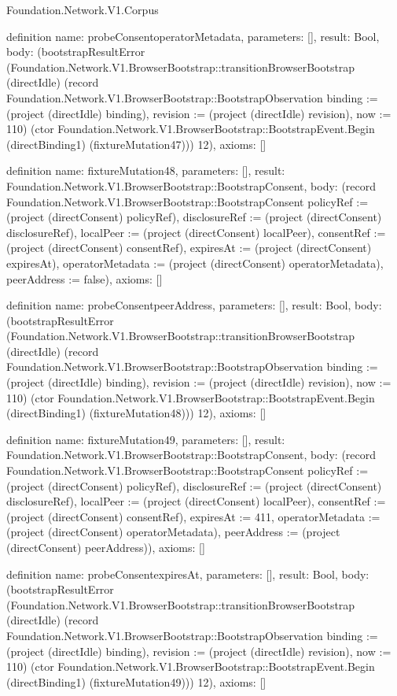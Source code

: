 \begin{lexlean}{Foundation.Network.V1.Corpus}
\begin{semanticmodule}
definition{
  name: probeConsentoperatorMetadata,
  parameters: [],
  result: Bool,
  body: (bootstrapResultError (Foundation.Network.V1.BrowserBootstrap::transitionBrowserBootstrap (directIdle) (record Foundation.Network.V1.BrowserBootstrap::BootstrapObservation {binding := (project (directIdle) binding), revision := (project (directIdle) revision), now := 110}) (ctor Foundation.Network.V1.BrowserBootstrap::BootstrapEvent.Begin (directBinding1) (fixtureMutation47))) 12),
  axioms: []
}

definition{
  name: fixtureMutation48,
  parameters: [],
  result: Foundation.Network.V1.BrowserBootstrap::BootstrapConsent,
  body: (record Foundation.Network.V1.BrowserBootstrap::BootstrapConsent {policyRef := (project (directConsent) policyRef), disclosureRef := (project (directConsent) disclosureRef), localPeer := (project (directConsent) localPeer), consentRef := (project (directConsent) consentRef), expiresAt := (project (directConsent) expiresAt), operatorMetadata := (project (directConsent) operatorMetadata), peerAddress := false}),
  axioms: []
}

definition{
  name: probeConsentpeerAddress,
  parameters: [],
  result: Bool,
  body: (bootstrapResultError (Foundation.Network.V1.BrowserBootstrap::transitionBrowserBootstrap (directIdle) (record Foundation.Network.V1.BrowserBootstrap::BootstrapObservation {binding := (project (directIdle) binding), revision := (project (directIdle) revision), now := 110}) (ctor Foundation.Network.V1.BrowserBootstrap::BootstrapEvent.Begin (directBinding1) (fixtureMutation48))) 12),
  axioms: []
}

definition{
  name: fixtureMutation49,
  parameters: [],
  result: Foundation.Network.V1.BrowserBootstrap::BootstrapConsent,
  body: (record Foundation.Network.V1.BrowserBootstrap::BootstrapConsent {policyRef := (project (directConsent) policyRef), disclosureRef := (project (directConsent) disclosureRef), localPeer := (project (directConsent) localPeer), consentRef := (project (directConsent) consentRef), expiresAt := 411, operatorMetadata := (project (directConsent) operatorMetadata), peerAddress := (project (directConsent) peerAddress)}),
  axioms: []
}

definition{
  name: probeConsentexpiresAt,
  parameters: [],
  result: Bool,
  body: (bootstrapResultError (Foundation.Network.V1.BrowserBootstrap::transitionBrowserBootstrap (directIdle) (record Foundation.Network.V1.BrowserBootstrap::BootstrapObservation {binding := (project (directIdle) binding), revision := (project (directIdle) revision), now := 110}) (ctor Foundation.Network.V1.BrowserBootstrap::BootstrapEvent.Begin (directBinding1) (fixtureMutation49))) 12),
  axioms: []
}


\end{semanticmodule}
\end{lexlean}
